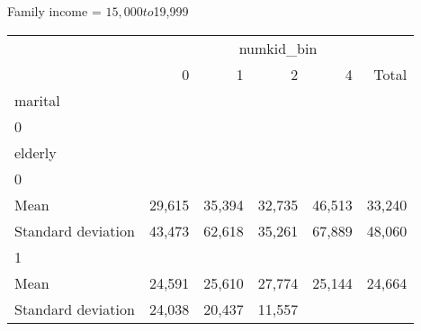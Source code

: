 Family income = $15,000 to $19,999
\begin{tabular}{llllll}
\cline{1-6}
\multicolumn{1}{c}{} &
  \multicolumn{5}{|c}{numkid\_bin} \\
\multicolumn{1}{c}{} &
  \multicolumn{1}{|r}{0} &
  \multicolumn{1}{r}{1} &
  \multicolumn{1}{r}{2} &
  \multicolumn{1}{r}{4} &
  \multicolumn{1}{r}{Total} \\
\cline{1-6}
\multicolumn{1}{l}{marital} &
  \multicolumn{1}{|r}{} &
  \multicolumn{1}{r}{} &
  \multicolumn{1}{r}{} &
  \multicolumn{1}{r}{} &
  \multicolumn{1}{r}{} \\
\multicolumn{1}{l}{\hspace{1em}0} &
  \multicolumn{1}{|r}{} &
  \multicolumn{1}{r}{} &
  \multicolumn{1}{r}{} &
  \multicolumn{1}{r}{} &
  \multicolumn{1}{r}{} \\
\multicolumn{1}{l}{\hspace{2em}elderly} &
  \multicolumn{1}{|r}{} &
  \multicolumn{1}{r}{} &
  \multicolumn{1}{r}{} &
  \multicolumn{1}{r}{} &
  \multicolumn{1}{r}{} \\
\multicolumn{1}{l}{\hspace{3em}0} &
  \multicolumn{1}{|r}{} &
  \multicolumn{1}{r}{} &
  \multicolumn{1}{r}{} &
  \multicolumn{1}{r}{} &
  \multicolumn{1}{r}{} \\
\multicolumn{1}{l}{\hspace{4em}Mean} &
  \multicolumn{1}{|r}{29,615} &
  \multicolumn{1}{r}{35,394} &
  \multicolumn{1}{r}{32,735} &
  \multicolumn{1}{r}{46,513} &
  \multicolumn{1}{r}{33,240} \\
\multicolumn{1}{l}{\hspace{4em}Standard deviation} &
  \multicolumn{1}{|r}{43,473} &
  \multicolumn{1}{r}{62,618} &
  \multicolumn{1}{r}{35,261} &
  \multicolumn{1}{r}{67,889} &
  \multicolumn{1}{r}{48,060} \\
\multicolumn{1}{l}{\hspace{3em}1} &
  \multicolumn{1}{|r}{} &
  \multicolumn{1}{r}{} &
  \multicolumn{1}{r}{} &
  \multicolumn{1}{r}{} &
  \multicolumn{1}{r}{} \\
\multicolumn{1}{l}{\hspace{4em}Mean} &
  \multicolumn{1}{|r}{24,591} &
  \multicolumn{1}{r}{25,610} &
  \multicolumn{1}{r}{27,774} &
  \multicolumn{1}{r}{25,144} &
  \multicolumn{1}{r}{24,664} \\
\multicolumn{1}{l}{\hspace{4em}Standard deviation} &
  \multicolumn{1}{|r}{24,038} &
  \multicolumn{1}{r}{20,437} &
  \multicolumn{1}{r}{11,557} &

\end{tabular}

